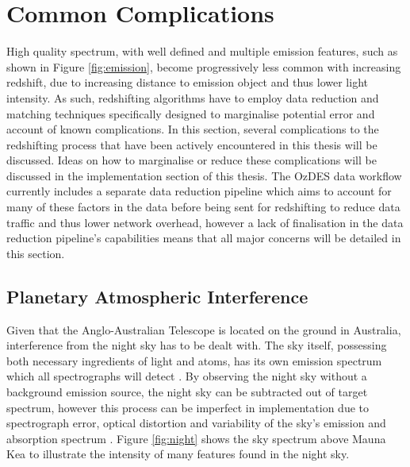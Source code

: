 \documentclass[titlesmallcaps, examinerscopy, copyrightpage]{uqthesis}
\begin{document}
\section{Common Complications}

High quality spectrum, with well defined and multiple emission features, such as shown in Figure \ref{fig:emission}, become progressively less common with increasing redshift, due to increasing distance to emission object and thus lower light intensity. As such, redshifting algorithms have to employ data reduction and matching techniques specifically designed to marginalise potential error and account of known complications. In this section, several complications to the redshifting process that have been actively encountered in this thesis will be discussed. Ideas on how to marginalise or reduce these complications will be discussed in the implementation section of this thesis. The OzDES data workflow currently includes a separate data reduction pipeline which aims to account for many of these factors in the data before being sent for redshifting to reduce data traffic and thus lower network overhead, however a lack of finalisation in the data reduction pipeline's capabilities means that all major concerns will be detailed in this section.

\subsection{Planetary Atmospheric Interference}

Given that the Anglo-Australian Telescope is located on the ground in Australia, interference from the night sky has to be dealt with. The sky itself, possessing both necessary ingredients of light and atoms, has its own emission spectrum which all spectrographs will detect \cite{Meinel1950Emission}. By observing the night sky without a background emission source, the night sky can be subtracted out of target spectrum, however this process can be imperfect in implementation due to spectrograph error, optical distortion and variability of the sky's emission and absorption spectrum \cite{Kelson2003Optimal}. Figure \ref{fig:night} shows the sky spectrum above Mauna Kea to illustrate the intensity of many features found in the night sky.
\end{document}
